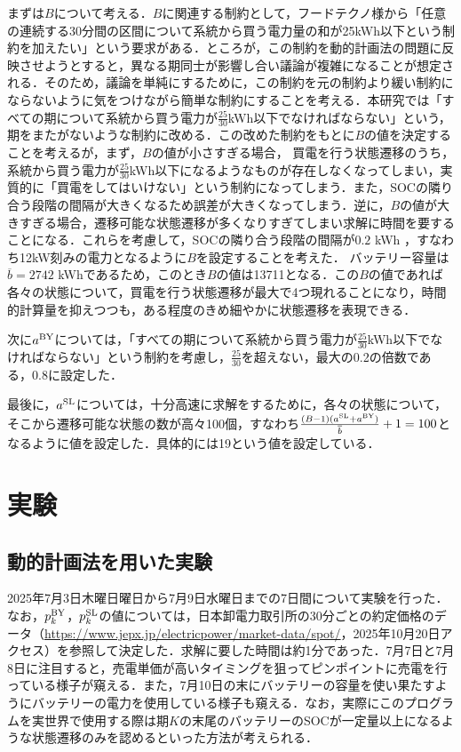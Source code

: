 \documentclass{jarticle}
\begin{document}
 まずは$B$について考える．$B$に関連する制約として，フードテクノ様から「任意の連続する30分間の区間について系統から買う電力量の和が25kWh以下という制約を加えたい」という要求がある．ところが，この制約を動的計画法の問題に反映させようとすると，異なる期同士が影響し合い議論が複雑になることが想定される．そのため，議論を単純にするために，この制約を元の制約より緩い制約にならないように気をつけながら簡単な制約にすることを考える．本研究では「すべての期について系統から買う電力が$\frac{25}{30}$kWh以下でなければならない」という，期をまたがないような制約に改める．この改めた制約をもとに$B$の値を決定することを考えるが，まず，$B$の値が小さすぎる場合，
 買電を行う状態遷移のうち，系統から買う電力が$\frac{25}{30}$kWh以下になるようなものが存在しなくなってしまい，実質的に「買電をしてはいけない」という制約になってしまう．また，SOCの隣り合う段階の間隔が大きくなるため誤差が大きくなってしまう．逆に，$B$の値が大きすぎる場合，遷移可能な状態遷移が多くなりすぎてしまい求解に時間を要することになる．これらを考慮して，SOCの隣り合う段階の間隔が$0.2$ kWh ，すなわち12kW刻みの電力となるように$B$を設定することを考えた．
バッテリー容量は$\overline{b}=2742$ kWhであるため，このとき$B$の値は13711となる．この$B$の値であれば各々の状態について，買電を行う状態遷移が最大で4つ現れることになり，時間的計算量を抑えつつも，ある程度のきめ細やかに状態遷移を表現できる．

次に$a^{\rm BY}$については，「すべての期について系統から買う電力が$\frac{25}{30}$kWh以下でなければならない」という制約を考慮し，$\frac{25}{30}$を超えない，最大の0.2の倍数である，0.8に設定した．


最後に，$a^{\rm SL} $については，十分高速に求解をするために，各々の状態について，そこから遷移可能な状態の数が高々100個，すなわち$\frac{(B-1)(a^{\rm SL}+a^{\rm BY})}{\overline{b}}  + 1= 100$となるように値を設定した．具体的には19という値を設定している．


\section{実験}
\subsection{動的計画法を用いた実験}
2025年7月3日木曜日曜日から7月9日水曜日までの7日間について実験を行った．
なお，$p^{\rm BY}_k$，$p^{\rm SL}_k$の値については，日本卸電力取引所の30分ごとの約定価格のデータ（\url{https://www.jepx.jp/electricpower/market-data/spot/}，2025年10月20日アクセス）を参照して決定した．求解に要した時間は約1分であった．7月7日と7月8日に注目すると，売電単価が高いタイミングを狙ってピンポイントに売電を行っている様子が窺える．また，7月10日の末にバッテリーの容量を使い果たすようにバッテリーの電力を使用している様子も窺える．なお，実際にこのプログラムを実世界で使用する際は期$K$の末尾のバッテリーのSOCが一定量以上になるような状態遷移のみを認めるといった方法が考えられる．
\end{document}
